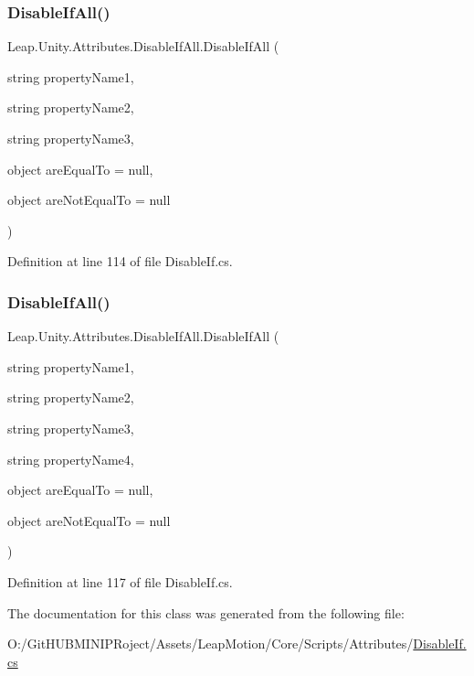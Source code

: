 \subsubsection{\texorpdfstring{DisableIfAll()}{DisableIfAll()}\hspace{0.1cm}{\footnotesize\ttfamily [2/3]}}
{\footnotesize\ttfamily Leap.\+Unity.\+Attributes.\+Disable\+If\+All.\+Disable\+If\+All (\begin{DoxyParamCaption}\item[{string}]{property\+Name1,  }\item[{string}]{property\+Name2,  }\item[{string}]{property\+Name3,  }\item[{object}]{are\+Equal\+To = {\ttfamily null},  }\item[{object}]{are\+Not\+Equal\+To = {\ttfamily null} }\end{DoxyParamCaption})}



Definition at line 114 of file Disable\+If.\+cs.

\mbox{\label{class_leap_1_1_unity_1_1_attributes_1_1_disable_if_all_af46624d8f1b932cc84de816738ede014}} 
\subsubsection{\texorpdfstring{DisableIfAll()}{DisableIfAll()}\hspace{0.1cm}{\footnotesize\ttfamily [3/3]}}
{\footnotesize\ttfamily Leap.\+Unity.\+Attributes.\+Disable\+If\+All.\+Disable\+If\+All (\begin{DoxyParamCaption}\item[{string}]{property\+Name1,  }\item[{string}]{property\+Name2,  }\item[{string}]{property\+Name3,  }\item[{string}]{property\+Name4,  }\item[{object}]{are\+Equal\+To = {\ttfamily null},  }\item[{object}]{are\+Not\+Equal\+To = {\ttfamily null} }\end{DoxyParamCaption})}



Definition at line 117 of file Disable\+If.\+cs.



The documentation for this class was generated from the following file\+:\begin{DoxyCompactItemize}
\item 
O\+:/\+Git\+H\+U\+B\+M\+I\+N\+I\+P\+Roject/\+Assets/\+Leap\+Motion/\+Core/\+Scripts/\+Attributes/\mbox{\hyperlink{_disable_if_8cs}{Disable\+If.\+cs}}\end{DoxyCompactItemize}
